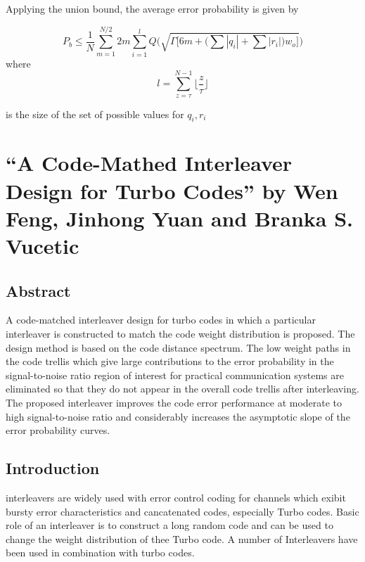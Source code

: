 \documentclass[11pt, oneside, dvipdfmx]{book}
\begin{document}
Applying the union bound, the average error probability is given by 

\begin{equation}
P_b \leq \frac{1}{N}\sum_{m=1}^{N/2} 2m \sum_{i=1}^{l}Q\Bigg( \sqrt{\Gamma \Bigg[6m +\Bigg( \sum |q_i| + \sum |r_i| \Bigg) w_o\Bigg]}\Bigg)
\end{equation}
where $$ l=\sum_{z=\tau}^{N-1} \Bigg\lfloor \frac{z}{\tau}\Bigg \rfloor $$

is the size of the set of possible values for $q_i,r_i$


\chapter{``A Code-Mathed Interleaver Design for Turbo Codes'' by Wen Feng, Jinhong Yuan and Branka S. Vucetic}

\section{Abstract}
A code-matched interleaver design for turbo codes
in which a particular interleaver is constructed to match the code
weight distribution is proposed. The design method is based on the
code distance spectrum. The low weight paths in the code trellis
which give large contributions to the error probability in the
signal-to-noise ratio region of interest for practical communication
systems are eliminated so that they do not appear in the overall
code trellis after interleaving. The proposed interleaver improves
the code error performance at moderate to high signal-to-noise
ratio and considerably increases the asymptotic slope of the error
probability curves.
\section{Introduction}
interleavers are widely used with error control coding for channels which exibit bursty error characteristics and cancatenated codes, especially Turbo codes.
Basic role of an interleaver is to construct a long random code and can be used to change the weight distribution of thee Turbo code. A number of Interleavers have been used in combination with turbo codes.
\end{document}
